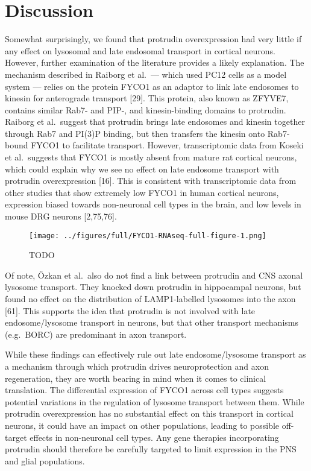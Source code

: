 \documentclass[
  12pt,
  a4paper,
]{book}
\begin{document}
\hypertarget{discussion}{%
\section{Discussion}\label{discussion}}

Somewhat surprisingly, we found that protrudin overexpression had very little if any effect on lysosomal and late endosomal transport in cortical neurons. However, further examination of the literature provides a likely explanation. The mechanism described in Raiborg et al.~--- which used PC12 cells as a model system --- relies on the protein FYCO1 as an adaptor to link late endosomes to kinesin for anterograde transport {[}29{]}. This protein, also known as ZFYVE7, contains similar Rab7- and PIP-, and kinesin-binding domains to protrudin. Raiborg et al.~suggest that protrudin brings late endosomes and kinesin together through Rab7 and PI(3)P binding, but then transfers the kinesin onto Rab7-bound FYCO1 to facilitate transport. However, transcriptomic data from Koseki et al.~suggests that FYCO1 is mostly absent from mature rat cortical neurons, which could explain why we see no effect on late endosome transport with protrudin overexpression {[}16{]}. This is consistent with transcriptomic data from other studies that show extremely low FYCO1 in human cortical neurons, expression biased towards non-neuronal cell types in the brain, and low levels in mouse DRG neurons {[}2,75,76{]}.

\begin{figure}
\centering
\texttt{[image: ../figures/full/FYCO1-RNAseq-full-figure-1.png]}
\caption{\label{fig:FYCO1-RNAseq-full-figure}TODO}
\end{figure}

Of note, Özkan et al.~also do not find a link between protrudin and CNS axonal lysosome transport. They knocked down protrudin in hippocampal neurons, but found no effect on the distribution of LAMP1-labelled lysosomes into the axon {[}61{]}. This supports the idea that protrudin is not involved with late endosome/lysosome transport in neurons, but that other transport mechanisms (e.g.~BORC) are predominant in axon transport.

While these findings can effectively rule out late endosome/lysosome transport as a mechanism through which protrudin drives neuroprotection and axon regeneration, they are worth bearing in mind when it comes to clinical translation. The differential expression of FYCO1 across cell types suggests potential variations in the regulation of lysosome transport between them. While protrudin overexpression has no substantial effect on this transport in cortical neurons, it could have an impact on other populations, leading to possible off-target effects in non-neuronal cell types. Any gene therapies incorporating protrudin should therefore be carefully targeted to limit expression in the PNS and glial populations.
\end{document}

